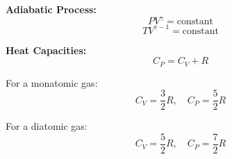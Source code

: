\documentclass{article}
\begin{document}
\textbf{Adiabatic Process:}
\begin{equation}
PV^{\gamma} = \text{constant}
\end{equation}
\begin{equation}
TV^{\gamma - 1} = \text{constant}
\end{equation}

\textbf{Heat Capacities:}
\begin{equation}
C_P = C_V + R
\end{equation}

For a monatomic gas:
\begin{equation}
C_V = \frac{3}{2} R, \quad C_P = \frac{5}{2} R
\end{equation}

For a diatomic gas:
\begin{equation}
C_V = \frac{5}{2} R, \quad C_P = \frac{7}{2} R
\end{equation}
\end{document}
